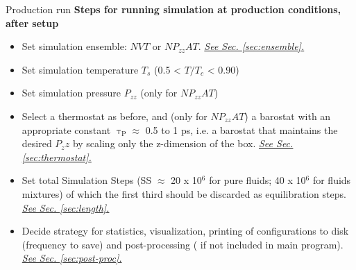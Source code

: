 \documentclass[9pt,tutorial]{livecoms}
\newcommand{\checkref}[1]{\uline{\emph{{\color{LiveCoMSDarkBlue}#1}}}}
\begin{document}
\begin{Checklists*}[p!]
\begin{checklist}{Production run}
\textbf{Steps for running simulation at production conditions, after setup}
\begin{itemize}
  \item Set simulation ensemble: $NVT$ or $NP_{zz}AT$. \checkref{See Sec. \ref{sec:ensemble}.} \\
\item Set simulation temperature $T_{s}$ (0.5 {\textless} $T/T_{c}$ {\textless} 0.90)  \\
\item Set simulation pressure $P_{zz}$ (only for $NP_{zz}AT$) \\
\item Select a thermostat as before, and (only for $NP_{zz}AT$) a barostat with an appropriate constant ${\uptau}_{\mathrm{P}}{\approx}$ 0.5 to 1 ps, i.e. a barostat that maintains the desired $P_zz$ by scaling only the z-dimension of the box. \checkref{See Sec. \ref{sec:thermostat}.}\\
\item Set total Simulation Steps (SS ${\approx}$ 20 x 10$^{6}$ for pure fluids; 40 x 10$^{6}$ for fluids mixtures) of which the first third should be discarded as equilibration steps. \checkref{See Sec. \ref{sec:length}.} \\
\item Decide strategy for statistics, visualization, printing of configurations to disk (frequency to save) and post-processing ( if not included in main program). \checkref{See Sec. \ref{sec:post-proc}.}\\
\end{itemize}
\end{checklist}


\end{Checklists*}

\clearpage





\end{document}
